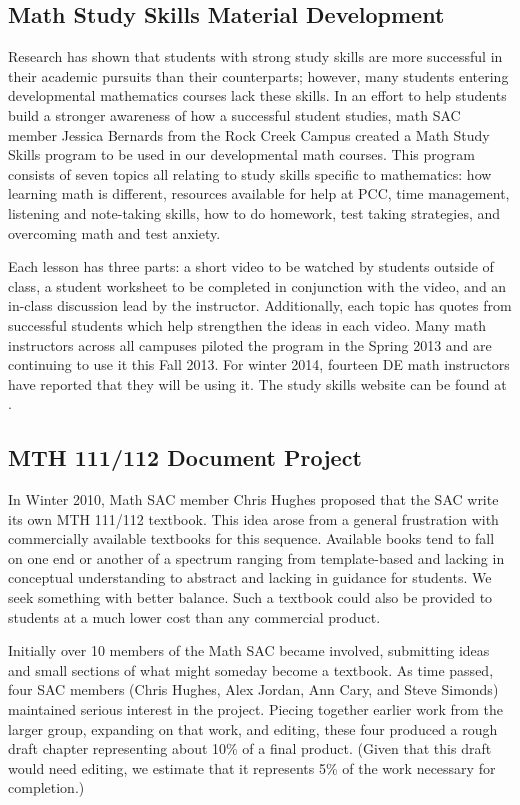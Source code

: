 \subsection{Math Study Skills Material Development}\label{cur:sub:studyskills}
Research has shown that students with strong study skills are more successful in
their academic pursuits than their counterparts; however, many
students entering developmental mathematics courses lack these skills.
In an effort to help students build a stronger awareness of how a successful
student studies, math SAC member Jessica Bernards from the Rock Creek Campus
created a Math Study Skills program to be used in our developmental math
courses.  This program consists of seven topics all relating to study skills
specific to mathematics: how learning math is different, resources available for
help at PCC, time management, listening and note-taking skills, how to do
homework, test taking strategies, and overcoming math and test anxiety.  

Each lesson has three parts: a short video to be watched by students
outside of class, a student worksheet to be completed in conjunction with the
video, and an in-class discussion lead by the instructor. Additionally, each
topic has quotes from successful students which help strengthen the ideas in
each video.  Many math instructors across all campuses piloted the program in
the Spring 2013 and are continuing to use it this Fall 2013. For winter 2014,
fourteen DE math instructors have reported that they will be using it. The study
skills website can be found at \cite{studyskills}.
 
\subsection{MTH 111/112 Document Project}\label{cur:sec:111/112doc}
In Winter 2010, Math SAC member Chris Hughes proposed that the SAC write its own
MTH 111/112 textbook. This idea arose from a general frustration with
commercially available textbooks for this sequence.  Available books tend to
fall on one end or another of a spectrum ranging from template-based and lacking
in conceptual understanding to abstract and lacking in guidance for students.
We seek something with better balance.  Such a 
textbook could also be provided to students at a much lower cost than any commercial 
product.

Initially over 10 members of the Math SAC became involved, submitting ideas and
small sections of what might someday become a textbook.  As time passed, four
SAC members (Chris Hughes, Alex Jordan, Ann Cary, and Steve Simonds) maintained
serious interest in the project.  Piecing together earlier work from the larger
group, expanding on that work, and editing, these four produced a rough draft
chapter representing about 10\% of a final product. (Given that this draft would
need editing, we estimate that it represents 5\% of the work necessary for
completion.)

